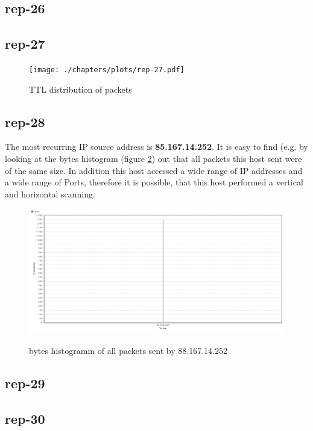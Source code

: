 \subsection*{rep-26}

\subsection*{rep-27}
\begin{figure}[H]
\center
\texttt{[image: ./chapters/plots/rep-27.pdf]}\\
\caption{TTL distribution of packets}
\label{fig:ttl-distribution}
\end{figure}
\subsection*{rep-28}
The most recurring IP source address is \textbf{85.167.14.252}.
It is easy to find (e.g. by looking at the bytes histogram (figure \ref{fig:bytes-histo}) out that all packets this host sent were of the same size. In addition this host accessed a wide range of IP addresses and a wide range of Ports, therefore it is possible, that this host performed a vertical and horizontal scanning.

\begin{figure}[H]
\center
\includegraphics[width=.9\textwidth]{./chapters/plots/rep-28-bytes-histo}\\
\caption{bytes histogramm of all packets sent by 88.167.14.252}
\label{fig:bytes-histo}
\end{figure}

\subsection*{rep-29}

\subsection*{rep-30}
